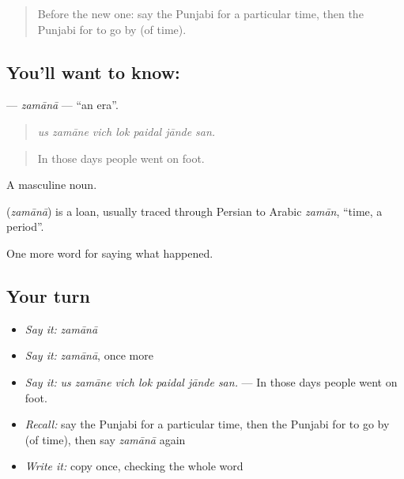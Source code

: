 \label{lesson:PA-C317-zamana}



\begin{quote}
Before the new one: say the Punjabi for a particular time, then the Punjabi for to go by (of time).
\end{quote}

\subsection*{You'll want to know: }
\textbf{} — \emph{zamānā} — \textquotedblleft{}an era\textquotedblright{}.

\begin{quote}
      
\end{quote}

\begin{quote}
\emph{us zamāne vich lok paidal jānde san.}
\end{quote}

\begin{quote}
In those days people went on foot.
\end{quote}

A masculine noun.

\begin{cousinweb}
\textbf{} (\emph{zamānā}) is a loan, usually traced through Persian to Arabic \emph{zamān}, \textquotedblleft{}time, a period\textquotedblright{}.
\end{cousinweb}

\begin{grammarlens}[title={What you've built}]
One more word for saying what happened.
\end{grammarlens}

\subsection*{Your turn}
\begin{itemize}
\raggedright
  \item \emph{Say it:} \emph{zamānā}
  \item \emph{Say it:} \emph{zamānā}, once more
  \item \emph{Say it:} \emph{us zamāne vich lok paidal jānde san.} — In those days people went on foot.
  \item \emph{Recall:} say the Punjabi for a particular time, then the Punjabi for to go by (of time), then say \emph{zamānā} again
  \item \emph{Write it:} copy \textbf{} once, checking the whole word
\end{itemize}

